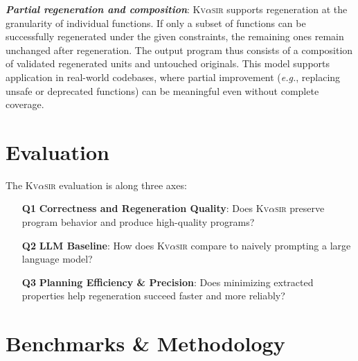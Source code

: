 \documentclass[nonacm,sigplan,review]{acmart}
\def\eg{{\em e.g.}, }
\newcommand{\sys}{{\scshape Kv{$\alpha$}sir}\xspace}
\newcommand{\heading}[1]{\vspace{2pt}\noindent\textbf{\emph{#1}}:\enspace}
\begin{document}
\heading{Partial regeneration and composition}
\sys supports regeneration at the granularity of individual functions.
If only a subset of functions can be successfully regenerated under the given constraints, the remaining ones remain unchanged after regeneration.
The output program thus consists of a composition of validated regenerated units and untouched originals.
This model supports application in real-world codebases, where partial improvement (\eg replacing unsafe or deprecated functions) can be meaningful even without complete coverage.

\section{Evaluation}
\label{sec:evaluation}

The \sys evaluation is along three axes:

\begin{itemize}
  \item[\textbf{Q1}] \textbf{Correctness and Regeneration Quality}: Does \sys preserve program behavior and produce high-quality programs?
  \item[\textbf{Q2}] \textbf{LLM Baseline}: How does \sys compare to naively prompting a large language model?
  \item[\textbf{Q3}] \textbf{Planning Efficiency \& Precision}: Does minimizing extracted properties help regeneration succeed faster and more reliably?
\end{itemize}

\section{Benchmarks \& Methodology}
\end{document}
